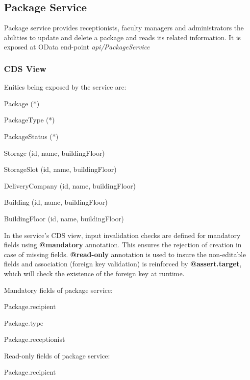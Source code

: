 \subsection{Package Service}
Package service provides receptionists, faculty managers and administrators the abilities to update and delete a package and reads its related information. It is exposed at OData end-point \textit{api/PackageService} 

\subsubsection{CDS View}

Enities being exposed by the service are:
\begin{compactenum}
	\item Package (*)
    \item PackageType (*)
    \item PackageStatus (*)
    \item Storage (id, name, buildingFloor)
    \item StorageSlot (id, name, buildingFloor)
    \item DeliveryCompany (id, name, buildingFloor)
    \item Building (id, name, buildingFloor)
    \item BuildingFloor (id, name, buildingFloor)
\end{compactenum}

\bigskip
In the service's CDS view, input invalidation checks are defined for mandatory fields using \textbf{@mandatory} annotation. This ensures the rejection of creation in case of missing fields. \textbf{@read-only} annotation is used to insure the non-editable fields and association (foreign key validation) is reinforced by \textbf{@assert.target}, which will check the existence of the foreign key at runtime.

\bigskip
Mandatory fields of package service:
\begin{compactenum}
	\item Package.recipient
    \item Package.type
    \item Package.receptionist
\end{compactenum}

\bigskip
Read-only fields of package service:
\begin{compactenum}
	\item Package.recipient
\end{compactenum}

